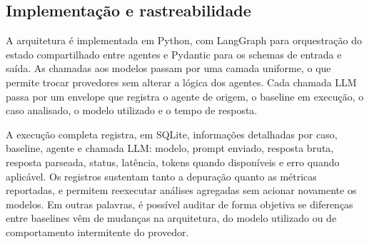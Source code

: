 \subsection{Implementação e rastreabilidade}

A arquitetura é implementada em Python, com LangGraph para orquestração
do estado compartilhado entre agentes e Pydantic para os schemas de
entrada e saída. As chamadas aos modelos passam por uma camada uniforme,
o que permite trocar provedores sem alterar a lógica dos agentes. Cada
chamada LLM passa por um envelope que registra o agente de origem, o
baseline em execução, o caso analisado, o modelo utilizado e o tempo de
resposta.

A execução completa registra, em SQLite, informações detalhadas por
caso, baseline, agente e chamada LLM: modelo, prompt enviado, resposta
bruta, resposta parseada, status, latência, tokens quando disponíveis e
erro quando aplicável. Os registros sustentam tanto a depuração quanto
as métricas reportadas, e permitem reexecutar análises agregadas sem
acionar novamente os modelos. Em outras palavras, é possível auditar de
forma objetiva se diferenças entre baselines vêm de mudanças na
arquitetura, do modelo utilizado ou de comportamento intermitente do
provedor.
